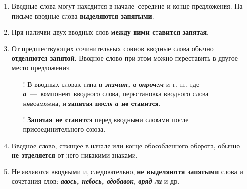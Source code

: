 \documentclass[main]{subfile}
\begin{document}
\begin{enumerate}
      \item Вводные слова могут находится в начале, середине и конце предложения. На письме вводные слова \textbf{выделяются запятыми}. \newline
      \item При наличии двух вводных слов \textbf{между ними ставится запятая}. \newline
      \item От предшествующих сочинительных союзов вводные слова обычно \textbf{отделяются запятой}. Вводное слово при этом можно переставить в другое место предложения. \newline

            \begin{itemize}
                  \item[!] В вводных словах типа \textit{\textbf{а значит, а впрочем}} и т. п., где \textit{\textbf{а}} --- компонент вводного слова, перестановка вводного слова невозможна, и \textbf{запятая после \textit{а} не ставится}. \newline
                  \item[!] \textbf{Запятая не ставится} перед вводными словами после присоединительного союза. \newline
            \end{itemize}

      \item Вводное слово, стоящее в начале или конце обособленного оборота, обычно \textbf{не отделяется} от него никакими знаками. \newline
      \item Не являются вводными и, следовательно, \textbf{не выделяются запятыми} слова и сочетания слов: \textit{\textbf{авось, небось, вдобавок, вряд ли}} и др. \newline
\end{enumerate}
\end{document}
